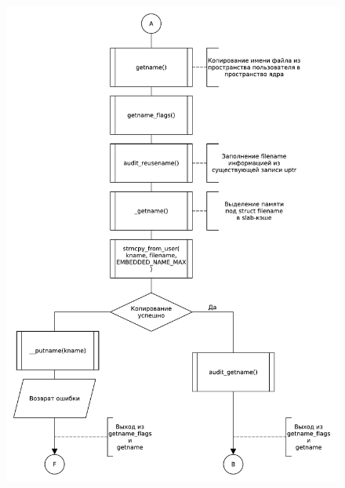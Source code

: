 \begin{figure}[H]
    \centering
    \caption{}
    \includegraphics[scale=0.5]{pdf/flowchart02.pdf}
\end{figure}
